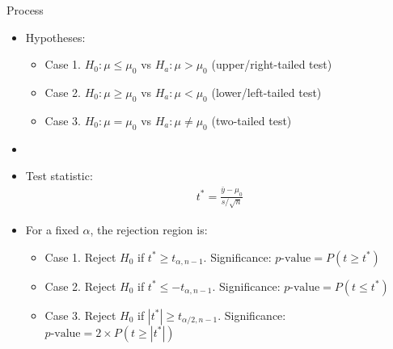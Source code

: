 \documentclass[xcolor=dvipsnames]{beamer}
\begin{document}
\begin{frame}{Process}
\begin{itemize}
	\item Hypotheses:  \pause
	\begin{itemize}
		\item Case 1. $H_0: \mu \leq \mu_0$ vs $H_a: \mu > \mu_0$ (upper/right-tailed test)  \pause
		\item Case 2. $H_0: \mu \geq \mu_0$ vs $H_a: \mu < \mu_0$ (lower/left-tailed test)  \pause
		\item Case 3. $H_0: \mu = \mu_0$ vs $H_a: \mu \neq \mu_0$ (two-tailed test)  \pause
	\end{itemize}
	\item[]
	\item Test statistic:  \pause
	\begin{gather*}
	t^* = \frac{\bar{y} - \mu_0}{s / \sqrt{n}}
	\end{gather*}  \pause
	
	\item For a fixed $\alpha$, the rejection region is:
	\begin{itemize}
		\item Case 1. Reject $H_0$ if $t^* \geq t_{\alpha, n-1}$. Significance: $p\text{-value}=P(t \geq t^*)$  \pause
		\item Case 2. Reject $H_0$ if $t^* \leq -t_{\alpha, n-1}$. Significance: $p\text{-value}=P(t \leq t^*)$  \pause
		\item Case 3. Reject $H_0$ if $|t^*| \geq t_{\alpha / 2, n-1}$. Significance: $p\text{-value}=2 \times P(t \geq |t^*|)$
	\end{itemize}
\end{itemize}
\end{frame}
\end{document}
